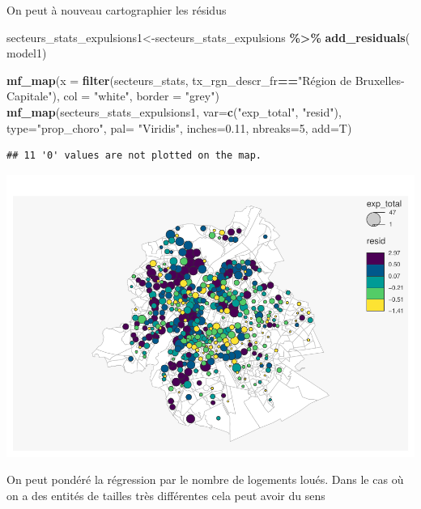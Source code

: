 \documentclass[
]{book}
\newenvironment{Shaded}{\begin{snugshade}}{\end{snugshade}}
\newcommand{\AttributeTok}[1]{\textcolor[rgb]{0.13,0.29,0.53}{#1}}
\newcommand{\DecValTok}[1]{\textcolor[rgb]{0.00,0.00,0.81}{#1}}
\newcommand{\FloatTok}[1]{\textcolor[rgb]{0.00,0.00,0.81}{#1}}
\newcommand{\FunctionTok}[1]{\textcolor[rgb]{0.13,0.29,0.53}{\textbf{#1}}}
\newcommand{\NormalTok}[1]{#1}
\newcommand{\OtherTok}[1]{\textcolor[rgb]{0.56,0.35,0.01}{#1}}
\newcommand{\SpecialCharTok}[1]{\textcolor[rgb]{0.81,0.36,0.00}{\textbf{#1}}}
\newcommand{\StringTok}[1]{\textcolor[rgb]{0.31,0.60,0.02}{#1}}
\begin{document}
On peut à nouveau cartographier les résidus

\begin{Shaded}
\begin{Highlighting}[]
\NormalTok{secteurs\_stats\_expulsions1}\OtherTok{\textless{}{-}}\NormalTok{secteurs\_stats\_expulsions }\SpecialCharTok{\%\textgreater{}\%}
  \FunctionTok{add\_residuals}\NormalTok{( model1)}

\FunctionTok{mf\_map}\NormalTok{(}\AttributeTok{x =} \FunctionTok{filter}\NormalTok{(secteurs\_stats, tx\_rgn\_descr\_fr}\SpecialCharTok{==}\StringTok{"Région de Bruxelles{-}Capitale"}\NormalTok{),}
       \AttributeTok{col =} \StringTok{"white"}\NormalTok{, }\AttributeTok{border =} \StringTok{"grey"}\NormalTok{)}
\FunctionTok{mf\_map}\NormalTok{(secteurs\_stats\_expulsions1,}
       \AttributeTok{var=}\FunctionTok{c}\NormalTok{(}\StringTok{"exp\_total"}\NormalTok{, }\StringTok{"resid"}\NormalTok{),}
       \AttributeTok{type=}\StringTok{"prop\_choro"}\NormalTok{,}
       \AttributeTok{pal=} \StringTok{"Viridis"}\NormalTok{,}
       \AttributeTok{inches=}\FloatTok{0.11}\NormalTok{,}
       \AttributeTok{nbreaks=}\DecValTok{5}\NormalTok{,}
       \AttributeTok{add=}\NormalTok{T)}
\end{Highlighting}
\end{Shaded}

\begin{verbatim}
## 11 '0' values are not plotted on the map.
\end{verbatim}

\includegraphics{bookdown-demo_files/figure-latex/unnamed-chunk-39-1.pdf}

On peut pondéré la régression par le nombre de logements loués. Dans le
cas où on a des entités de tailles très différentes cela peut avoir du
sens
\end{document}
